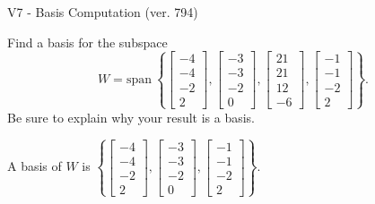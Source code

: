 \begin{exercise}
  \begin{exerciseTitle}V7 - Basis Computation (ver. 794)\end{exerciseTitle}
  \begin{exerciseStatement}
    Find a basis for the subspace 
\[W=\mathrm{span}\ \left\{\left[\begin{array}{r}
-4 \\
-4 \\
-2 \\
2
\end{array}\right] , \left[\begin{array}{r}
-3 \\
-3 \\
-2 \\
0
\end{array}\right] , \left[\begin{array}{r}
21 \\
21 \\
12 \\
-6
\end{array}\right] , \left[\begin{array}{r}
-1 \\
-1 \\
-2 \\
2
\end{array}\right]\right\}.\]
 Be sure to explain why your result is a basis.


  \end{exerciseStatement}
  \begin{exerciseAnswer}
   A basis of \(W\) is  \(\left\{\left[\begin{array}{r}
-4 \\
-4 \\
-2 \\
2
\end{array}\right] , \left[\begin{array}{r}
-3 \\
-3 \\
-2 \\
0
\end{array}\right] , \left[\begin{array}{r}
-1 \\
-1 \\
-2 \\
2
\end{array}\right]\right\}\).
  


  \end{exerciseAnswer}
\end{exercise}